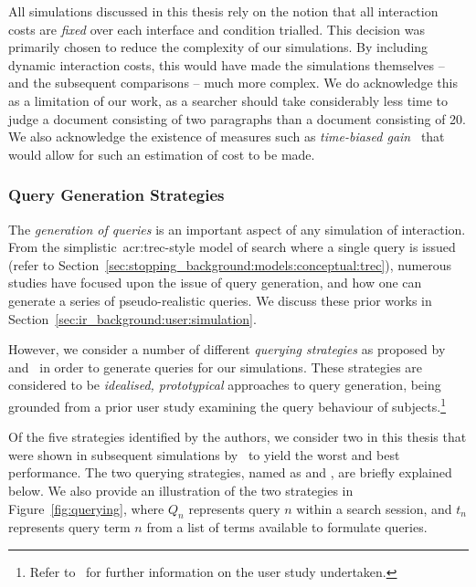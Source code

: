 All simulations discussed in this thesis rely on the notion that all interaction costs are \emph{fixed} over each interface and condition trialled. This decision was primarily chosen to reduce the complexity of our simulations. By including dynamic interaction costs, this would have made the simulations themselves -- and the subsequent comparisons -- much more complex. We do acknowledge this as a limitation of our work, as a searcher should take considerably less time to judge a document consisting of two paragraphs than a document consisting of 20. We also acknowledge the existence of measures such as \emph{time-biased gain}~\citep{smucker2012tbg} that would allow for such an estimation of cost to be made.

\subsubsection{Query Generation Strategies}\label{chap:csm:method:simulation:grounding:querying}
The \emph{generation of queries} is an important aspect of any simulation of interaction. From the simplistic~\gls{acr:trec}-style model of search where a single query is issued (refer to Section~\ref{sec:stopping_background:models:conceptual:trec}), numerous studies have focused upon the issue of query generation, and how one can generate a series of pseudo-realistic queries. We discuss these prior works in Section~\ref{sec:ir_background:user:simulation}.

However, we consider a number of different \emph{querying strategies} as proposed by~\cite{keskustalo2009querying} and~\cite{baskaya2013behavioural_factors} in order to generate queries for our simulations. These strategies are considered to be \emph{idealised, prototypical} approaches to query generation, being grounded from a prior user study examining the query behaviour of subjects.\footnote{Refer to~\cite{keskustalo2009querying} for further information on the user study undertaken.}

Of the five strategies identified by the authors, we consider two in this thesis that were shown in subsequent simulations by~\cite{keskustalo2009querying} to yield the worst and best performance. The two querying strategies, named as  and , are briefly explained below. We also provide an illustration of the two strategies in Figure~\ref{fig:querying}, where $Q_n$ represents query $n$ within a search session, and $t_n$ represents query term $n$ from a list of terms available to formulate queries.

